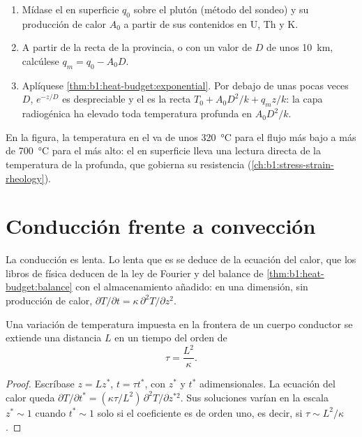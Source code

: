 \begin{method}\label{met:b1:heat-budget:moho}
\begin{enumerate}
  \item Mídase el  en superficie $q_0$ sobre el plutón (método del sondeo) y su producción de calor $A_0$ a partir de
        sus contenidos en U, Th y K.
  \item A partir de la recta de la provincia, o con un valor de $D$ de unos \qty{10}{km}, calcúlese $q_m = q_0 - A_0 D$.
  \item Aplíquese \cref{thm:b1:heat-budget:exponential}. Por debajo de unas pocas veces $D$, $e^{-z/D}$ es despreciable y el
         es la recta $T_0 + A_0D^2/k + q_m z/k$: la capa radiogénica ha elevado toda temperatura profunda en $A_0D^2/k$.
\end{enumerate}
\end{method}

En la figura, la temperatura en el  va de unos \qty{320}{\degreeCelsius} para el flujo más bajo a más de \qty{700}{\degreeCelsius}
para el más alto: el  en superficie lleva una lectura directa de la temperatura de la  profunda, que gobierna
su resistencia (\cref{ch:b1:stress-strain-rheology}).

\section{Conducción frente a convección}

La conducción es lenta. Lo lenta que es se deduce de la ecuación del calor, que los libros de física deducen de la ley de Fourier y
del balance de \cref{thm:b1:heat-budget:balance} con el almacenamiento añadido: en una dimensión, sin producción de calor,
$\partial T/\partial t = \kappa\,\partial^2 T/\partial z^2$.

\begin{proposition}\label{prop:b1:heat-budget:timescale}
Una variación de temperatura impuesta en la frontera de un cuerpo conductor se extiende una distancia $L$ en un tiempo del orden de
\[
  \tau = \frac{L^2}{\kappa} .
\]
\end{proposition}

\begin{proof}
Escríbase $z = L z^*$, $t = \tau t^*$, con $z^*$ y $t^*$ adimensionales. La ecuación del calor queda $\partial T/\partial t^* = (\kappa\tau/L^2)\,\partial^2
T/\partial z^{*2}$. Sus soluciones varían en la escala $z^* \sim 1$ cuando $t^* \sim 1$
solo si el coeficiente es de orden uno, es decir, si $\tau \sim L^2/\kappa$.
\end{proof}

